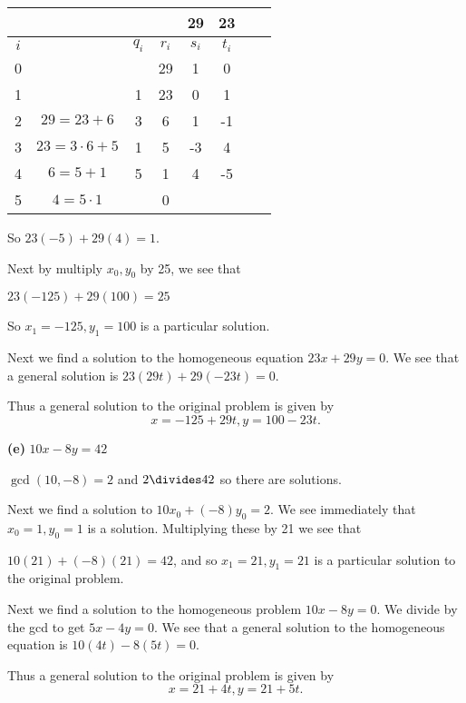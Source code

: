 \documentclass[oneside,12pt]{amsart}
\begin{document}
\begin{tabular}{|c|c|c|c|c|c|c|c|}
\hline
\quad & \quad               & \quad   & \quad & 29     & 23   \\ \hline
$i$   & \quad               & $q_{i}$ & $r_i$ & $s_i$  & $t_i$ \\ \hline\hline
0     & \quad               & \quad   & 29    &  1     & 0     \\ \hline
1     & \quad               & 1       & 23    &  0     & 1     \\ \hline
2     & $29 = 23 + 6$       & 3       & 6     &  1     &-1     \\ \hline
3     & $23 = 3\cdot 6 + 5$ & 1       & 5     & -3     & 4     \\ \hline
4     & $ 6 = 5 + 1$        & 5       & 1     &  4     &-5     \\ \hline
5     & $ 4 = 5\cdot 1 $    &         & 0     &        &       \\ \hline
\end{tabular}

So $23(-5) + 29(4) = 1.$

Next by multiply $x_0, y_0$ by 25, we see that

$23(-125) + 29(100) = 25$

So $x_1=-125, y_1=100$ is a particular solution.

Next we find a solution to the homogeneous equation $23x+29y = 0$.
We see that a general solution is $23(29t) + 29(-23t)=0$.

Thus a general solution to the original problem is given by
$$x=-125+29t, y=100-23t.$$

\bigskip

\textbf{(e)} $10x - 8y = 42$

$\gcd(10,-8) = 2$ and $2\divides 42$ so there are solutions.

Next we find a solution to $10x_0 + (-8)y_0 = 2$. We see immediately
that $x_0=1, y_0=1$ is a solution. Multiplying these by 21 we see that

$10(21)+(-8)(21) = 42$, and so $x_1=21,y_1=21$ is a particular solution
to the original problem.

Next we find a solution to the homogeneous problem $10x - 8y = 0$.
We divide by the gcd to get $5x - 4y = 0$. We see that a general solution
to the homogeneous equation is $10(4t) - 8(5t) = 0$.

Thus a general solution to the original problem is given by
$$x = 21+4t, y=21+5t.$$

\bigskip
\end{document}
